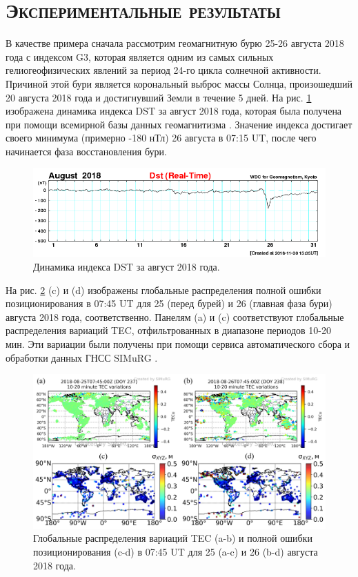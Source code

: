\section{\textsc{Экспериментальные результаты}}

В качестве примера сначала рассмотрим геомагнитную бурю 25-26 августа 2018 года с индексом G3, которая является одним из самых сильных гелиогеофизических явлений за период 24-го цикла солнечной активности.
Причиной этой бури является корональный выброс массы Солнца, произошедший 20 августа 2018 года и достигнувший Земли в течение 5 дней.
На рис. \ref{fig-dst1808} изображена динамика индекса DST за август 2018 года, которая была получена при помощи всемирной базы данных геомагнитизма \cite{WDC}. 
Значение индекса достигает своего минимума (примерно -180 нТл) 26 августа в 07:15 UT, после чего начинается фаза восстановления бури.   
\begin{figure}[h]
\includegraphics[width=\textwidth]{fig/dst1808.png}    
\caption{Динамика индекса DST за август 2018 года.}
\label{fig-dst1808}      
\end{figure} 

На рис. \ref{fig-2018-237-238-07-45} (c) и (d) изображены глобальные распределения полной ошибки позиционирования в 07:45 UT для 25 (перед бурей) и 26 (главная фаза бури) августа 2018 года, соответственно. 
Панелям (a) и (c) соответствуют глобальные распределения вариаций TEC, отфильтрованных в диапазоне периодов 10-20 мин.   
Эти вариации были получены при помощи сервиса автоматического сбора и обработки данных ГНСС SIMuRG \cite{Yasyukevich2020}.  
\begin{figure}[h]
\includegraphics[width=\textwidth]{fig/2018-237-238-07-45.png}    
\caption{Глобальные распределения вариаций TEC (a-b) и полной ошибки позиционирования (c-d) в 07:45 UT для 25 (a-c) и 26 (b-d) августа 2018 года.}
\label{fig-2018-237-238-07-45}      
\end{figure} 

